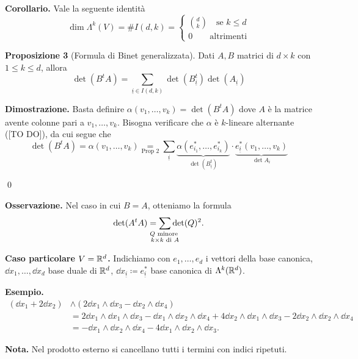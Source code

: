 \textbf{Corollario.} Vale la seguente identità 
%
$$
\dim \Lambda^k(V) = \# I(d,k) = 
\begin{cases}
	\binom{d}{k} \quad \text{se } k \leq d \\
	0 \qquad \text{altrimenti} 
\end{cases} 
$$
%

\textbf{Proposizione 3} (Formula di Binet generalizzata).
Dati $A,B$ matrici di $d \times k$ con $1 \leq k \leq d$, allora
%
$$
	\det(B^tA) = \sum_{\underline{i} \in I(d,k)} \det(B_{\underline{i}}^t) \det (A_{\underline{i}})
$$
%

\textbf{Dimostrazione.} Basta definire $\alpha(v_1,\ldots,v_k) = \det(B^t A)$ dove $A$ è la matrice avente colonne pari a $v_1,\ldots,v_k$.
Bisogna verificare che $\alpha$ è $k$-lineare alternante ([TO DO]), da cui segue che
%
$$
	\det(B^tA) = \alpha(v_1,\ldots,v_k) 
	\underset{\text{Prop 2} }{=} \sum_{\underline{i}} \underbrace{\alpha(e_{i_1}^*,\ldots,e_{i_k}^*)}_{\det(B_{\underline{i}}^t)}
	\cdot \underbrace{e_{\underline{i}}^* (v_1,\ldots,v_k)}_{\det A_i}
$$
%

\qed

\textbf{Osservazione.} Nel caso in cui $B = A$, otteniamo la formula
%
$$
	\det(A^tA) = \sum_{\mathclap{\substack{Q \text{ minore } \\ k \times k \text{ di } A }}} \det(Q)^2.
$$
%


\textbf{Caso particolare $V = \mathbb R^d$.} Indichiamo con $e_1,\ldots,e_d$ i vettori della base canonica, $\dd x_1,\ldots, \dd x_d$ base duale di $\mathbb R^d$, $\dd x_{\underline{i}} \coloneqq e_{\underline{i}}^*$ base canonica di $\Lambda^k(\mathbb R^d)$.


\textbf{Esempio.}
\begin{align*}
	(\dd x_1 + 2 \dd x_2) & \wedge (2 \dd x_1 \wedge \dd x_3 - \dd x_2 \wedge\dd x_4) \\
	& = 2 \dd x_1 \wedge\dd x_1 \wedge\dd x_3 - \dd x_1 \wedge\dd x_2 \wedge \dd x_4 + 4 \dd x_2 \wedge\dd x_1 \wedge\dd x_3 - 2 \dd x_2 \wedge\dd x_2 \wedge\dd x_4 \\
	& = - \dd x_1 \wedge\dd x_2 \wedge\dd x_4 - 4 \dd x_1 \wedge\dd x_2 \wedge\dd x_3.
\end{align*}

\textbf{Nota.} Nel prodotto esterno si cancellano tutti i termini con indici ripetuti.



